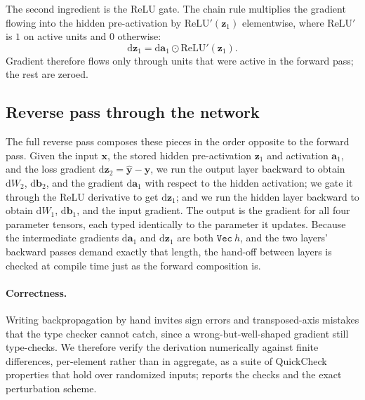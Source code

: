 \documentclass[sigconf,nonacm]{acmart}
\begin{document}
The second ingredient is the ReLU gate. The chain rule multiplies the gradient
flowing into the hidden pre-activation by \(\mathrm{ReLU}'(\mathbf{z}_1)\)
elementwise, where \(\mathrm{ReLU}'\) is \(1\) on active units and \(0\)
otherwise:
\[
  \mathrm{d}\mathbf{z}_1 = \mathrm{d}\mathbf{a}_1 \odot \mathrm{ReLU}'(\mathbf{z}_1).
\]
Gradient therefore flows only through units that were active in the forward
pass; the rest are zeroed.

\subsection{Reverse pass through the network}
\label{sec:bp:network}

The full reverse pass composes these pieces in the order opposite to the forward
pass. Given the input \(\mathbf{x}\), the stored hidden pre-activation
\(\mathbf{z}_1\) and activation \(\mathbf{a}_1\), and the loss gradient
\(\mathrm{d}\mathbf{z}_2 = \hat{\mathbf{y}} - \mathbf{y}\), we run the output
layer backward to obtain \(\mathrm{d}W_2\), \(\mathrm{d}\mathbf{b}_2\), and the
gradient \(\mathrm{d}\mathbf{a}_1\) with respect to the hidden activation; we
gate it through the ReLU derivative to get \(\mathrm{d}\mathbf{z}_1\); and we run
the hidden layer backward to obtain \(\mathrm{d}W_1\), \(\mathrm{d}\mathbf{b}_1\),
and the input gradient. The output is the gradient for all four parameter
tensors, each typed identically to the parameter it updates. Because the
intermediate gradients \(\mathrm{d}\mathbf{a}_1\) and \(\mathrm{d}\mathbf{z}_1\)
are both \(\mathtt{Vec}\ h\), and the two layers' backward passes demand exactly
that length, the hand-off between layers is checked at compile time just as the
forward composition is.

\paragraph{Correctness.}
Writing backpropagation by hand invites sign errors and transposed-axis mistakes
that the type checker cannot catch, since a wrong-but-well-shaped gradient still
type-checks. We therefore verify the derivation numerically against finite
differences, per-element rather than in aggregate, as a suite of QuickCheck
properties that hold over randomized inputs;  reports the
checks and the exact perturbation scheme.

\end{document}
